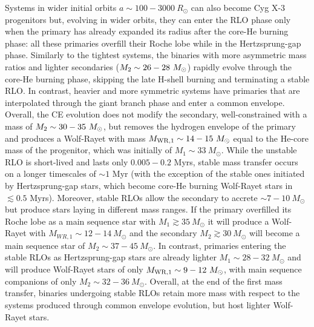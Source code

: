 \documentclass[a4paper,titlepage]{book}     	%
\newcommand{\sun}{\ensuremath{_\odot}}
\newcommand{\msun}{\ensuremath{M\sun}}
\newcommand{\rsun}{R_{\odot}}
\begin{document}
Systems in wider initial orbits $a \sim 100 - 3000~\rsun$ can also become Cyg X-3 progenitors but, evolving in wider orbits, they can enter the RLO phase only when the primary has already expanded its radius after the core-He burning phase: all these primaries overfill their Roche lobe while in the Hertzsprung-gap phase. Similarly to the tightest systems, the binaries with more asymmetric mass ratios and lighter secondaries ($M_{\rm 2} \sim 26-28~\msun$) rapidly evolve through the core-He burning phase, skipping the late H-shell burning and terminating a stable RLO. In contrast, heavier and more symmetric systems have primaries that are interpolated through the giant branch phase and enter a common envelope.\\

Overall, the CE evolution does not modify the secondary, well-constrained with a mass of $M_{\rm 2} \sim 30-35~\msun$, but removes the hydrogen envelope of the primary and produces a Wolf-Rayet with mass $M_{\rm WR,1} \sim 14-15~\msun$ equal to the He-core mass of the progenitor, which was initially of $M_1 \sim 33~\msun$. While the unstable RLO is short-lived and lasts only $0.005-0.2$ Myrs, stable mass transfer occurs on a longer timescales of $\sim 1$ Myr (with the exception of the stable ones initiated by Hertzsprung-gap stars, which become core-He burning Wolf-Rayet stars in $\lesssim 0.5$ Myrs). Moreover, stable RLOs allow the secondary to accrete $\sim 7-10~\msun$ but produce stars laying in different mass ranges. If the primary overfilled its Roche lobe as a main sequence star with $M_1 \gtrsim 35~\msun$ it will produce a Wolf-Rayet with $M_{WR,1} \sim 12-14~\msun$ and the secondary $M_2 \gtrsim 30~\msun$ will become a main sequence star of $M_{2} \sim 37-45~\msun$. In contrast, primaries entering the stable RLOs as Hertzsprung-gap stars are already lighter $M_1 \sim 28-32~\msun$ and will produce Wolf-Rayet stars of only $M_{\rm WR,1} \sim 9-12~\msun$, with main sequence companions of only $M_2 \sim 32-36~\msun$. Overall, at the end of the first mass transfer, binaries undergoing stable RLOs retain more mass with respect to the systems produced through common envelope evolution, but host lighter Wolf-Rayet stars.
\end{document}

